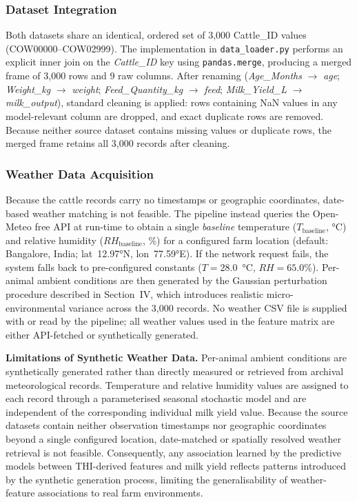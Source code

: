 \documentclass[conference]{IEEEtran}
\begin{document}
	\subsubsection{Dataset Integration}
	Both datasets share an identical, ordered set of 3,000 Cattle\_ID values
	(COW00000–COW02999).
	The implementation in \texttt{data\_loader.py} performs an explicit inner
	join on the \textit{Cattle\_ID} key using \texttt{pandas.merge}, producing
	a merged frame of 3,000 rows and 9 raw columns.
	After renaming (\textit{Age\_Months} $\to$ \textit{age};
	\textit{Weight\_kg} $\to$ \textit{weight};
	\textit{Feed\_Quantity\_kg} $\to$ \textit{feed};
	\textit{Milk\_Yield\_L} $\to$ \textit{milk\_output}),
	standard cleaning is applied: rows containing NaN values in any
	model-relevant column are dropped, and exact duplicate rows are removed.
	Because neither source dataset contains missing values or duplicate rows,
	the merged frame retains all 3,000 records after cleaning.

	\subsubsection{Weather Data Acquisition}
	Because the cattle records carry no timestamps or geographic coordinates,
	date-based weather matching is not feasible.
	The pipeline instead queries the Open-Meteo free API \cite{ref1} at
	run-time to obtain a single \textit{baseline} temperature ($T_{\text{baseline}}$,
	°C) and relative humidity ($RH_{\text{baseline}}$, \%) for a configured
	farm location (default: Bangalore, India; lat~12.97°N, lon~77.59°E).
	If the network request fails, the system falls back to pre-configured
	constants ($T = 28.0$~°C, $RH = 65.0$\%).
	Per-animal ambient conditions are then generated by the Gaussian
	perturbation procedure described in Section~IV, which introduces
	realistic micro-environmental variance across the 3,000 records.
	No weather CSV file is supplied with or read by the pipeline; all
	weather values used in the feature matrix are either API-fetched or
	synthetically generated.

	\textbf{Limitations of Synthetic Weather Data.}
	Per-animal ambient conditions are synthetically generated rather than directly measured or retrieved from archival meteorological records.
	Temperature and relative humidity values are assigned to each record through a parameterised seasonal stochastic model and are independent of the corresponding individual milk yield value.
	Because the source datasets contain neither observation timestamps nor geographic coordinates beyond a single configured location, date-matched or spatially resolved weather retrieval is not feasible.
	Consequently, any association learned by the predictive models between THI-derived features and milk yield reflects patterns introduced by the synthetic generation process, limiting the generalisability of weather-feature associations to real farm environments.
\end{document}

